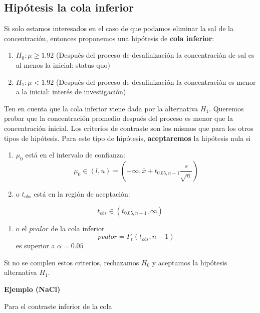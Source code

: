 \documentclass[
]{book}
\providecommand{\tightlist}{%
  \setlength{\itemsep}{0pt}\setlength{\parskip}{0pt}}
\begin{document}
\hypertarget{hipuxf3tesis-la-cola-inferior}{%
\subsection{Hipótesis la cola inferior}\label{hipuxf3tesis-la-cola-inferior}}

Si solo estamos interesados en el caso de que podamos eliminar la sal de la concentración, entonces proponemos una hipótesis de \textbf{cola inferior}:

\begin{enumerate}
\def\labelenumi{\alph{enumi}.}
\tightlist
\item
  \(H_0:\mu \geq 1.92\) (Después del proceso de desalinización la concentración de sal es al menos la inicial: status quo)
\item
  \(H_1:\mu < 1.92\) (Después del proceso de desalinización la concentración es menor a la inicial: interés de investigación)
\end{enumerate}

Ten en cuenta que la cola inferior viene dada por la alternativa \(H_1\). Queremos probar que la concentración promedio después del proceso es menor que la concentración inicial. Los criterios de contraste son los mismos que para los otros tipos de hipótesis. Para este tipo de hipótesis, \textbf{aceptaremos} la hipótesis nula si

\begin{enumerate}
\def\labelenumi{\arabic{enumi}.}
\item
  \(\mu_0\) está en el intervalo de confianza:
  \[\mu_0\in (l,u)=(-\infty, \bar{x}+t_{0.05,n-1} \frac{s}{\sqrt{n}})\]
\item
  o \(t_{obs}\) está en la región de aceptación:
\end{enumerate}

\[t_{obs}\in (t_{0.05,n-1}, \infty)\]

\begin{enumerate}
\def\labelenumi{\arabic{enumi}.}
\setcounter{enumi}{2}
\tightlist
\item
  o el \(pvalor\) de la cola inferior
  \[pvalor=F_t(t_{obs},n-1)\]
  es superior a \(\alpha=0.05\)
\end{enumerate}

Si no se complen estos criterios, rechazamos \(H_0\) y aceptamos la hipótesis alternativa \(H_1\).

\textbf{Ejemplo (NaCl)}

Para el contraste inferior de la cola
\end{document}
